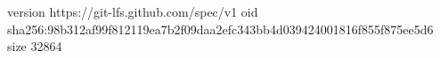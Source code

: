 version https://git-lfs.github.com/spec/v1
oid sha256:98b312af99f812119ea7b2f09daa2efc343bb4d039424001816f855f875ee5d6
size 32864
